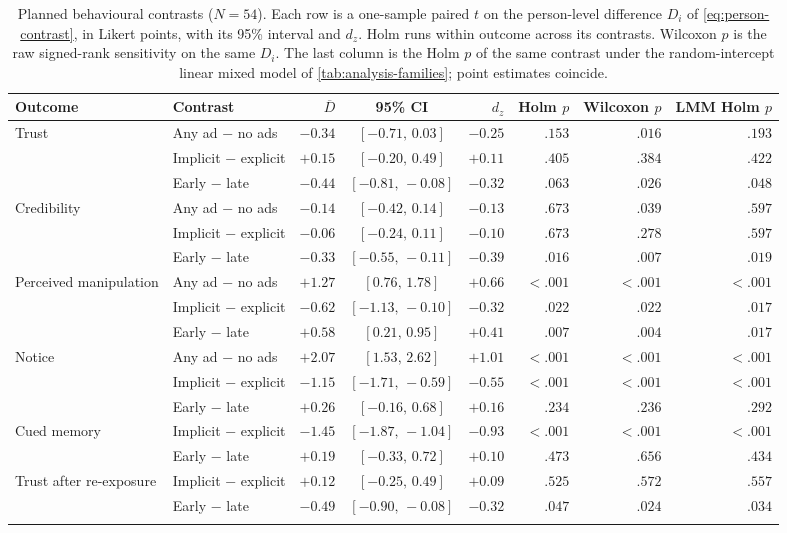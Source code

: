 \begin{table}[!htb]
\centering
\small
\caption{Planned behavioural contrasts (\(N=54\)). Each row is a one-sample paired \(t\) on the person-level difference \(D_i\) of \eqref{eq:person-contrast}, in Likert points, with its 95\% interval and \(d_z\). Holm runs within outcome across its contrasts. Wilcoxon \(p\) is the raw signed-rank sensitivity on the same \(D_i\). The last column is the Holm \(p\) of the same contrast under the random-intercept linear mixed model of \autoref{tab:analysis-families}; point estimates coincide.}
\label{tab:beh-planned}
\setlength{\tabcolsep}{4pt}
\begin{tabular}{@{}ll r c r r r r@{}}
\toprule
Outcome & Contrast & \(\overline{D}\) & 95\% CI & \(d_z\) & Holm \(p\) & Wilcoxon \(p\) & LMM Holm \(p\) \\
\midrule
Trust & Any ad − no ads & $-0.34$ & $[-0.71,\,0.03]$ & $-0.25$ & $.153$ & $.016$ & $.193$ \\
 & Implicit − explicit & $+0.15$ & $[-0.20,\,0.49]$ & $+0.11$ & $.405$ & $.384$ & $.422$ \\
 & Early − late & $-0.44$ & $[-0.81,\,-0.08]$ & $-0.32$ & $.063$ & $.026$ & $.048$ \\
\addlinespace[2pt]
Credibility & Any ad − no ads & $-0.14$ & $[-0.42,\,0.14]$ & $-0.13$ & $.673$ & $.039$ & $.597$ \\
 & Implicit − explicit & $-0.06$ & $[-0.24,\,0.11]$ & $-0.10$ & $.673$ & $.278$ & $.597$ \\
 & Early − late & $-0.33$ & $[-0.55,\,-0.11]$ & $-0.39$ & $.016$ & $.007$ & $.019$ \\
\addlinespace[2pt]
Perceived manipulation & Any ad − no ads & $+1.27$ & $[0.76,\,1.78]$ & $+0.66$ & $<.001$ & $<.001$ & $<.001$ \\
 & Implicit − explicit & $-0.62$ & $[-1.13,\,-0.10]$ & $-0.32$ & $.022$ & $.022$ & $.017$ \\
 & Early − late & $+0.58$ & $[0.21,\,0.95]$ & $+0.41$ & $.007$ & $.004$ & $.017$ \\
\addlinespace[2pt]
Notice & Any ad − no ads & $+2.07$ & $[1.53,\,2.62]$ & $+1.01$ & $<.001$ & $<.001$ & $<.001$ \\
 & Implicit − explicit & $-1.15$ & $[-1.71,\,-0.59]$ & $-0.55$ & $<.001$ & $<.001$ & $<.001$ \\
 & Early − late & $+0.26$ & $[-0.16,\,0.68]$ & $+0.16$ & $.234$ & $.236$ & $.292$ \\
\addlinespace[2pt]
\midrule
Cued memory & Implicit − explicit & $-1.45$ & $[-1.87,\,-1.04]$ & $-0.93$ & $<.001$ & $<.001$ & $<.001$ \\
 & Early − late & $+0.19$ & $[-0.33,\,0.72]$ & $+0.10$ & $.473$ & $.656$ & $.434$ \\
\addlinespace[2pt]
Trust after re-exposure & Implicit − explicit & $+0.12$ & $[-0.25,\,0.49]$ & $+0.09$ & $.525$ & $.572$ & $.557$ \\
 & Early − late & $-0.49$ & $[-0.90,\,-0.08]$ & $-0.32$ & $.047$ & $.024$ & $.034$ \\
\addlinespace[2pt]
\bottomrule
\end{tabular}
\end{table}
